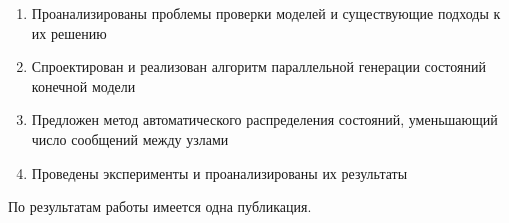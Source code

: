 \documentclass[12pt]{article}
\begin{document}
\small
\begin{enumerate}
\item Проанализированы проблемы проверки моделей и существующие подходы к их решению
\item Спроектирован и реализован алгоритм параллельной генерации состояний конечной
  модели
\item Предложен метод автоматического распределения состояний, уменьшающий число сообщений
  между узлами
\item Проведены эксперименты и проанализированы их результаты
\end{enumerate}

По результатам работы имеется одна публикация.
\end{document}
